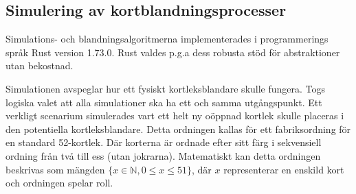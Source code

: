 \documentclass[swedish,a4paper]{article}
\begin{document}
\subsection{Simulering av kortblandningsprocesser}
Simulations- och blandningsalgoritmerna implementerades i programmerings språk
Rust version 1.73.0. Rust valdes p.g.a dess robusta stöd för abstraktioner utan bekostnad.  

% 



Simulationen avspeglar hur ett fysiskt
kortleksblandare skulle fungera. Togs logiska valet att alla simulationer ska ha 
ett och samma utgångspunkt. Ett verkligt scenarium simulerades vart ett helt ny
oöppnad kortlek skulle placeras i den potentiella kortleksblandare. Detta
ordningen kallas för ett fabriksordning för en standard 52-kortlek. Där korterna
är ordnade efter sitt färg i sekvensiell ordning från två till ess (utan jokrarna).
Matematiskt kan detta ordningen beskrivas som mängden $\{x \in \mathbb{N},  0 \leq x \leq 51
\}$, där $x$ representerar en enskild kort och ordningen spelar roll. 


\end{document}
